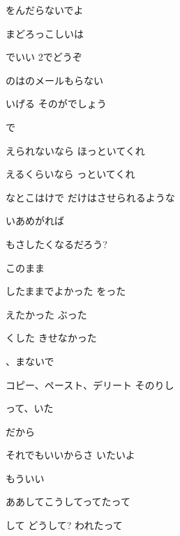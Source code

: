 \documentclass[14pt]{ltjsarticle}
\begin{document}
{  をんだらないでよ
  \jisho{}

\item
  
まどろっこしいは
  \jisho{}

  でいい 2でどうぞ
  \jisho{}

\item
  のはのメールもらない
  \jisho{}

  いげる そのがでしょう
  \jisho{}

\item
  で
  \jisho{}

  えられないなら ほっといてくれ
  \jisho{}

  えるくらいなら っといてくれ
  \jisho{}

  なとこはけで だけはさせられるような
  \jisho{}

  いあめがれば
  \jisho{}

  もさしたくなるだろう?
  \jisho{}

  
このまま
  \jisho{}

  したままでよかった をった
  \jisho{}

  えたかった ぶった
  \jisho{}

  くした きせなかった
  \jisho{}

  、まないで
  \jisho{}

\item
  
コピー、ペースト、デリート そのりし
  \jisho{}

  って、いた
  \jisho{}

  
だから
  \jisho{}

  
それでもいいからさ いたいよ
  \jisho{}

\item
  
もういい
  \jisho{}

  
ああしてこうしてってたって
  \jisho{}

  して どうして? われたって
  \jisho{}

}
\end{document}
